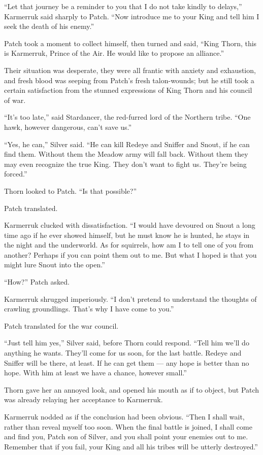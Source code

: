 \documentclass[12pt]{memoir}
\begin{document}
“Let that journey be a reminder to you that I do not take kindly to
delays,” Karmerruk said sharply to Patch. “Now introduce me to your
King and tell him I seek the death of his enemy.”

Patch took a moment to collect himself, then turned and said, “King
Thorn, this is Karmerruk, Prince of the Air. He would like to propose
an alliance.”

Their situation was desperate, they were all frantic with anxiety and
exhaustion, and fresh blood was seeping from Patch’s fresh
talon-wounds; but he still took a certain satisfaction from the
stunned expressions of King Thorn and his council of war.

“It’s too late,” said Stardancer, the red-furred lord of the Northern
tribe. “One hawk, however dangerous, can’t save us.”

“Yes, he can,” Silver said. “He can kill Redeye and Sniffer and Snout,
if he can find them. Without them the Meadow army will fall
back. Without them they may even recognize the true King. They don’t
want to fight us. They’re being forced.”

Thorn looked to Patch. “Is that possible?”

Patch translated.

Karmerruk clucked with dissatisfaction. “I would have devoured on
Snout a long time ago if he ever showed himself, but he must know he
is hunted, he stays in the night and the underworld. As for squirrels,
how am I to tell one of you from another? Perhaps if you can point
them out to me. But what I hoped is that you might lure Snout into the
open.”

“How?” Patch asked.

Karmerruk shrugged imperiously. “I don’t pretend to understand the
thoughts of crawling groundlings. That’s why I have come to you.”

Patch translated for the war council.

“Just tell him yes,” Silver said, before Thorn could respond. “Tell
him we’ll do anything he wants. They’ll come for us soon, for the last
battle. Redeye and Sniffer will be there, at least. If he can get them
— any hope is better than no hope. With him at least we have a chance,
however small.”

Thorn gave her an annoyed look, and opened his mouth as if to object,
but Patch was already relaying her acceptance to Karmerruk.

Karmerruk nodded as if the conclusion had been obvious. “Then I shall
wait, rather than reveal myself too soon. When the final battle is
joined, I shall come and find you, Patch son of Silver, and you shall
point your enemies out to me. Remember that if you fail, your King and
all his tribes will be utterly destroyed.”
\end{document}
